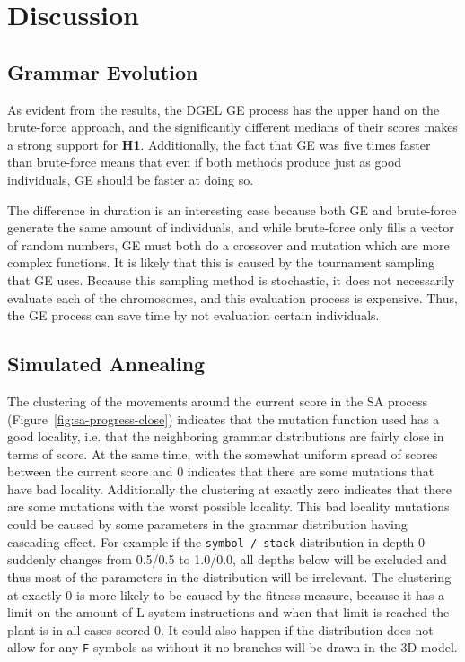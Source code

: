 \chapter{Discussion}
\section{Grammar Evolution}
As evident from the results, the DGEL GE process has the upper hand on the brute-force approach, and the significantly different medians of their scores makes a strong support for \textbf{H1}.
Additionally, the fact that GE was five times faster than brute-force means that even if both methods produce just as good individuals, GE should be faster at doing so.

The difference in duration is an interesting case because both GE and brute-force generate the same amount of individuals, and while brute-force only fills a vector of random numbers, GE must both do a crossover and mutation which are more complex functions.
It is likely that this is caused by the tournament sampling that GE uses.
Because this sampling method is stochastic, it does not necessarily evaluate each of the chromosomes, and this evaluation process is expensive.
Thus, the GE process can save time by not evaluation certain individuals.

\section{Simulated Annealing}
The clustering of the movements around the current score in the SA process (Figure~\ref{fig:sa-progress-close}) indicates that the mutation function used has a good locality, i.e. that the neighboring grammar distributions are fairly close in terms of score.
At the same time, with the somewhat uniform spread of scores between the current score and 0 indicates that there are some mutations that have bad locality.
Additionally the clustering at exactly zero indicates that there are some mutations with the worst possible locality.
This bad locality mutations could be caused by some parameters in the grammar distribution having cascading effect.
For example if the \texttt{symbol / stack} distribution in depth 0 suddenly changes from 0.5/0.5 to 1.0/0.0, all depths below will be excluded and thus most of the parameters in the distribution will be irrelevant.
The clustering at exactly 0 is more likely to be caused by the fitness measure, because it has a limit on the amount of L-system instructions and when that limit is reached the plant is in all cases scored 0.
It could also happen if the distribution does not allow for any \texttt{F} symbols as without it no branches will be drawn in the 3D model.

